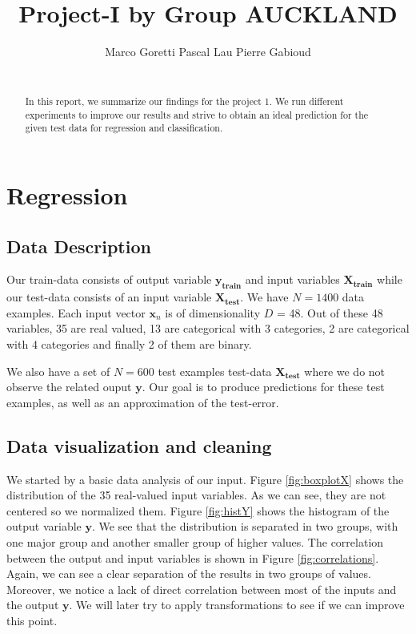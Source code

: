 \documentclass{article} %
\title{Project-I by Group AUCKLAND}
\author{
Marco Goretti \And Pascal Lau \And Pierre Gabioud \\
\texttt{} \\
}
\begin{document}
\maketitle

\begin{abstract}
In this report, we summarize our findings for the project 1. We run different experiments to improve our results and strive to obtain an ideal prediction for the given test data for regression and classification.

\end{abstract}

\section{Regression}
\subsection{Data Description}
Our train-data consists of output variable $\mathbf{y_{train}}$ and input variables $\mathbf{X_{train}}$ while our test-data consists of an input variable $\mathbf{X_{test}}$. We have $N=1400$ data examples. Each input vector $\mathbf{x}_n$ is of dimensionality $D$ = 48. Out of these 48 variables, 35 are real valued, 13 are categorical with 3 categories, 2 are categorical with 4 categories and finally 2 of them are binary.

We also have a set of $N=600$ test examples test-data $\mathbf{X_{test}}$ where we do not observe the related ouput $\mathbf{y}$. Our goal is to produce predictions for these test examples, as well as an approximation of the test-error.

\subsection{Data visualization and cleaning}
We started by a basic data analysis of our input. Figure \ref{fig:boxplotX} shows the distribution of the 35 real-valued input variables. As we can see, they are not centered so we normalized them. Figure \ref{fig:histY} shows the histogram of the output variable $\mathbf{y}$. We see that the distribution is separated in two groups, with one major group and another smaller group of higher values.
The correlation between the output and input variables is shown in Figure \ref{fig:correlations}. Again, we can see a clear separation of the results in two groups of values. Moreover, we notice a lack of direct correlation between most of the inputs and the output $\mathbf{y}$. We will later try to apply transformations to see if we can improve this point.
\end{document}
